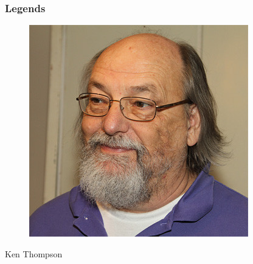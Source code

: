 \documentclass{../c-lecture}
\begin{document}
\begin{frame}
  \frametitle{Legends}
  \begin{figure}
    \includegraphics[height=.75\textheight]{./img/ken.jpg}
  \end{figure}
  \pause%
  \centering
  \color{Violet} Ken Thompson
\end{frame}
\end{document}
